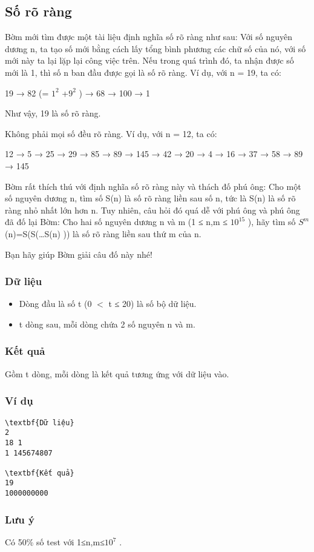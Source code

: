 







\subsection{   Số rõ ràng  }

   Bờm mới tìm được một tài liệu định nghĩa số rõ ràng như sau: Với số nguyên dương n, ta tạo số mới bằng cách lấy tổng bình phương các chữ số của nó, với số mới này ta lại lặp lại công việc trên. Nếu trong quá trình đó, ta nhận được số mới là 1, thì số n ban đầu được gọi là số rõ ràng. Ví dụ, với n = 19, ta có:  

   19 → 82 (= $1^{2}$   +$9^{2}$   ) → 68 → 100 → 1  

   Như vậy, 19 là số rõ ràng.  

   Không phải mọi số đều rõ ràng. Ví dụ, với n = 12, ta có:  

   12 → 5 → 25 → 29 → 85 → 89 → 145 → 42 → 20 → 4 → 16 → 37 → 58 → 89 → 145  

   Bờm rất thích thú với định nghĩa số rõ ràng này và thách đố phú ông: Cho một số nguyên dương n, tìm số S(n) là số rõ ràng liền sau số n, tức là S(n) là số rõ ràng nhỏ nhất lớn hơn n. Tuy nhiên, câu hỏi đó quá dễ với phú ông và phú ông đã đố lại Bờm: Cho hai số nguyên dương n và m (1 ≤ n,m ≤ $10^{15}$   ), hãy tìm số $S^{m}$   (n)=S(S(…S(n) )) là số rõ ràng liền sau thứ m của n.  

   Bạn hãy giúp Bờm giải câu đố này nhé!  

\subsubsection{   Dữ liệu  }
\begin{itemize}
	\item     Dòng đầu là số t (0 $<$ t ≤ 20) là số bộ dữ liệu.   
	\item     t dòng sau, mỗi dòng chứa 2 số nguyên n và m.   
\end{itemize}

\subsubsection{   Kết quả  }

   Gồm t dòng, mỗi dòng là kết quả tương ứng với dữ liệu vào.  

\subsubsection{   Ví dụ  }
\begin{verbatim}
\textbf{Dữ liệu}
2
18 1
1 145674807	

\textbf{Kết quả}
19
1000000000
\end{verbatim}

\subsubsection{   Lưu ý  }

   Có 50\% số test với 1≤n,m≤$10^{7}$   .  

